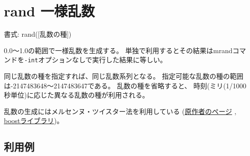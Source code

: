 
%

\section{rand 一様乱数\label{sect:rand}}

書式: rand([乱数の種])

0.0〜1.0の範囲で一様乱数を生成する。
単独で利用するとその結果はmrandコマンドを\verb|-int|オプションなしで実行した結果に等しい。

同じ乱数の種を指定すれば、同じ乱数系列となる。
指定可能な乱数の種の範囲は-2147483648〜2147483647である。
乱数の種を省略すると、
時刻(ミリ(1/1000秒単位)に応じた異なる乱数の種が利用される。

乱数の生成にはメルセンヌ・ツイスター法を利用している
(\href{http://www.math.sci.hiroshima-u.ac.jp/~m-mat/MT/emt.html}{原作者のページ}
, \href{http://www.boost.org/doc/libs/1_54_0/doc/html/boost_random.html}{boostライブラリ})。

\subsection*{利用例}


%
